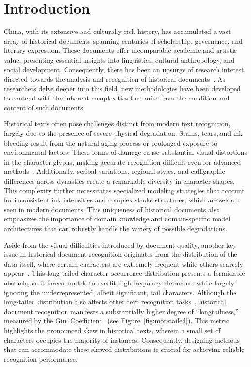 \section{Introduction}

China, with its extensive and culturally rich history, has accumulated a vast array of historical documents spanning centuries of scholarship, governance, and literary expression. These documents offer incomparable academic and artistic value, presenting essential insights into linguistics, cultural anthropology, and social development. Consequently, there has been an upsurge of research interest directed towards the analysis and recognition of historical documents~\cite{jinic21,hde,obc306}. As researchers delve deeper into this field, new methodologies have been developed to contend with the inherent complexities that arise from the condition and content of such documents.

Historical texts often pose challenges distinct from modern text recognition, largely due to the presence of severe physical degradation. Stains, tears, and ink bleeding result from the natural aging process or prolonged exposure to environmental factors. These forms of damage cause substantial visual distortions in the character glyphs, making accurate recognition difficult even for advanced methods~\cite{Hong2021, Dou2021}. Additionally, scribal variations, regional styles, and calligraphic differences across dynasties create a remarkable diversity in character shapes. This complexity further necessitates specialized modeling strategies that account for inconsistent ink intensities and complex stroke structures, which are seldom seen in modern documents. This uniqueness of historical documents also emphasizes the importance of domain knowledge and domain-specific model architectures that can robustly handle the variety of possible degradations.

Aside from the visual difficulties introduced by document quality, another key issue in historical document recognition originates from the distribution of the data itself, where certain characters are extremely frequent while others scarcely appear~\cite{obcmk2}. This long-tailed character occurrence distribution presents a formidable obstacle, as it forces models to overfit high-frequency characters while largely ignoring the underrepresented, albeit significant, tail characters. Although the long-tailed distribution also affects other text recognition tasks~\cite{fudanvi}, historical document recognition manifests a substantially higher degree of ``longtailness,'' measured by the Gini Coefficient~\cite{tailsurvey} (see Figure~\ref{fig:moretailed}). This metric highlights the pronounced skew in historical texts, wherein a small set of characters occupies the majority of instances. Consequently, designing methods that can accommodate these skewed distributions is crucial for achieving reliable recognition performance.

